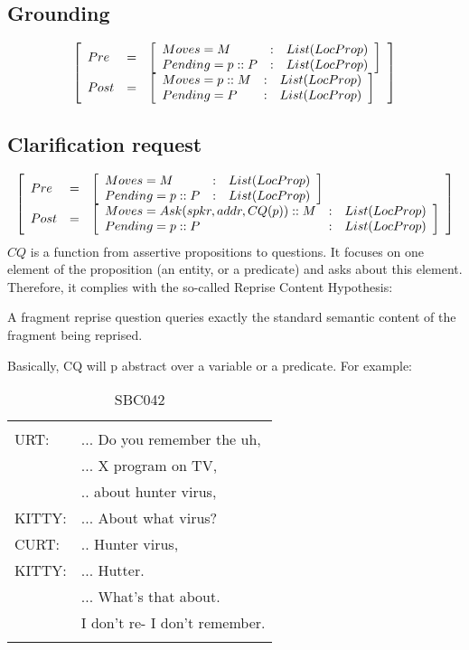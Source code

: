 \documentclass[11pt]{article}
\newenvironment{sbcquote}[2]
{
	\def\savedcaption{\caption{#1}}%
	\def\savedlabel{\label{#2}}%
	\begin{table}[h]
		\centering
		\begin{small}
		\begin{tabular}{ll}
			\hline
			& \\
}
{
	& \\
	\hline
	\end{tabular}
	\end{small}
	\savedcaption
	\savedlabel
\end{table}
}
\newenvironment{recenv}
{\left[\begin{array}{lll}}
{\end{array}\right]}
\begin{document}
			\subsection{Grounding}
				\begin{equation*}
				\begin{recenv}
				Pre  &=& \begin{recenv}
				Moves = M &:& List(LocProp) \\
				Pending = p :: P &:& List(LocProp)\\
				\end{recenv}\\
				Post &=& \begin{recenv}
				Moves = p :: M &:& List(LocProp)\\
				Pending = P &:& List(LocProp)
				\end{recenv}
				\end{recenv}
				\end{equation*}
			\subsection{Clarification request}
				\begin{equation*}
				\begin{recenv}
				Pre  &=& \begin{recenv}
				Moves = M &:& List(LocProp) \\
				Pending = p :: P &:& List(LocProp)\\
				\end{recenv}\\
				Post &=& \begin{recenv}
				Moves = Ask(spkr, addr, CQ(p)) :: M &:& List(LocProp)\\
				Pending = p :: P &:& List(LocProp)
				\end{recenv}
				\end{recenv}
				\end{equation*}
				$CQ$ is a function from assertive propositions to questions. It focuses on one element of the proposition (an entity, or a predicate) and asks about this element. Therefore, it complies with the so-called Reprise Content Hypothesis:
				\begin{center}
					A fragment reprise question queries exactly the standard semantic content of the fragment being reprised.
				\end{center}
				Basically, CQ will p abstract over a variable or a predicate. For example:
				
				\begin{sbcquote}{SBC042}
					CURT:&	... Do you remember the uh,\\
					&... X program on TV,\\
					&.. about hunter virus,\\
					KITTY:&	... About what virus?\\
					CURT:&	.. Hunter virus,\\
					KITTY:&	... Hutter.\\
					&... What's that about.\\
					&I don't re- I don't remember.\\
				\end{sbcquote}
\end{document}
